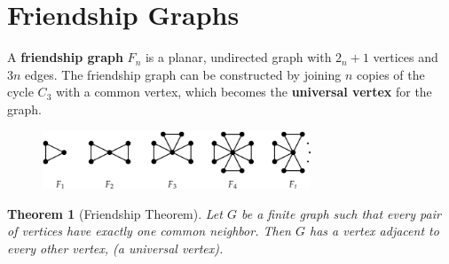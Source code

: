 \documentclass{article}
\newtheorem{theorem}{Theorem}[section]
\begin{document}
\section{Friendship Graphs}
A \textbf{friendship graph} $F_n$ is a planar, undirected graph with $2_n + 1$ vertices and $3n$ edges. The friendship graph can be constructed by joining $n$ copies of the cycle $C_3$ with a common vertex, which becomes the \textbf{universal vertex} for the graph.  

\begin{figure}[htp]
    \centering
    \includegraphics[width=8cm]{friendship_graphs.png}
    \label{fig:friendship_graphs}
\end{figure}

\begin{theorem}[Friendship Theorem]
\label{theorem:friendship}
Let $G$ be a finite graph such that every pair of vertices have exactly one common neighbor. Then $G$ has a vertex adjacent to every other vertex, (a universal vertex).
\end{theorem}
\end{document}
